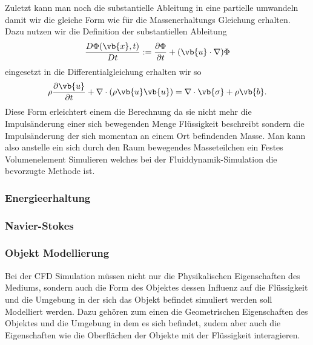 Zuletzt kann man noch die substantielle Ableitung in eine partielle umwandeln damit wir die gleiche Form wie für die Massenerhaltungs Gleichung erhalten.
Dazu nutzen wir die Definition der substantiellen Ableitung
\[
\frac{D\Phi(\vb{x},t)}{Dt}
:=
\frac{\partial \Phi}{\partial t}+(\vb{u}\cdot \nabla)\Phi
\] 
eingesetzt in die Differentialgleichung erhalten wir so 
\[ \rho\frac{\partial\vb{u}}{\partial t} + \nabla \cdot(\rho\vb{u}\vb{u})
= 
\nabla \cdot \vb{\sigma} +\rho \vb{b}.
\]
Diese Form erleichtert einem die Berechnung da sie nicht mehr die Impulsänderung einer sich bewegenden Menge Flüssigkeit beschreibt sondern die Impulsänderung der sich momentan an einem Ort befindenden Masse. Man kann also anstelle ein sich durch den Raum bewegendes Masseteilchen ein Festes Volumenelement Simulieren welches bei der Fluiddynamik-Simulation die bevorzugte Methode ist.
\subsubsection{Energieerhaltung}
\subsubsection{Navier-Stokes}
\subsubsection{Objekt Modellierung}
Bei der CFD Simulation müssen nicht nur die Physikalischen Eigenschaften des Mediums, sondern auch die Form des Objektes dessen Influenz auf die Flüssigkeit und die Umgebung in der sich das Objekt befindet simuliert werden soll Modelliert werden.
Dazu gehören zum einen die Geometrischen Eigenschaften des Objektes und die Umgebung in dem es sich befindet, zudem aber auch die Eigenschaften wie die Oberflächen der Objekte mit der Flüssigkeit interagieren.

